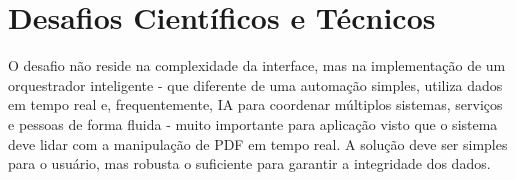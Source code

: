 \chapter{Desafios Científicos e Técnicos}
O desafio não reside na complexidade da interface, mas na implementação de um orquestrador inteligente - que diferente de uma automação simples, utiliza dados em tempo real e, frequentemente, IA para coordenar múltiplos sistemas, serviços e pessoas de forma fluida - muito importante para aplicação visto que o sistema deve lidar com a manipulação de PDF em tempo real. A solução deve ser simples para o usuário, mas robusta o suficiente para garantir a integridade dos dados.


